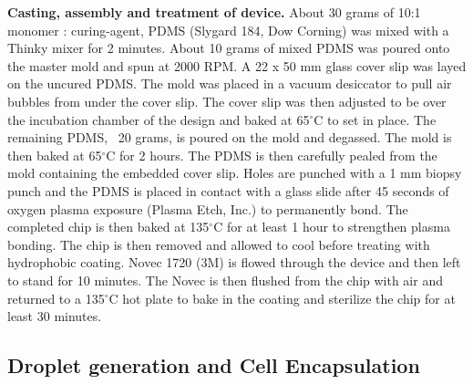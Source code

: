\textbf{Casting, assembly and treatment of device.} About 30 grams of 10:1 monomer : curing-agent, PDMS (Slygard 184, Dow Corning) was mixed with a Thinky mixer for 2 minutes.
About 10 grams of mixed PDMS was poured onto the master mold and spun at 2000 RPM.
A 22 x 50 mm glass cover slip was layed on the uncured PDMS.
The mold was placed in a vacuum desiccator to pull air bubbles from under the cover slip.
The cover slip was then adjusted to be over the incubation chamber of the design and baked at 65$^{\circ}$C to set in place.
The remaining PDMS, ~20 grams, is poured on the mold and degassed.
The mold is then baked at 65$^{\circ}$C for 2 hours.
The PDMS is then carefully pealed from the mold containing the embedded cover slip.
Holes are punched with a 1 mm biopsy punch and the PDMS is placed in contact with a glass slide after 45 seconds of oxygen plasma exposure (Plasma Etch, Inc.) to permanently bond.
The completed chip is then baked at 135$^{\circ}$C for at least 1 hour to strengthen plasma bonding.
The chip is then removed and allowed to cool before treating with hydrophobic coating.
Novec 1720 (3M) is flowed through the device and then left to stand for 10 minutes.
The Novec is then flushed from the chip with air and returned to a 135$^{\circ}$C hot plate to bake in the coating and sterilize the chip for at least 30 minutes.

\subsection{Droplet generation and Cell Encapsulation}

